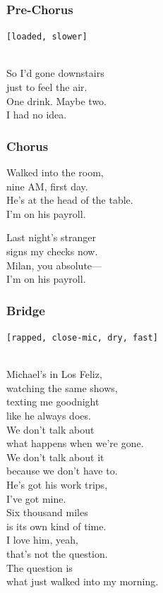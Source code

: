 \subsubsection{Pre-Chorus}\label{pre-chorus-39}

\texttt{{[}loaded,\ slower{]}}\strut \\
So I'd gone downstairs\\
just to feel the air.\\
One drink. Maybe two.\\
I had no idea.

\subsubsection{Chorus}\label{chorus-53}

Walked into the room,\\
nine AM, first day.\\
He's at the head of the table.\\
I'm on his payroll.

Last night's stranger\\
signs my checks now.\\
Milan, you absolute---\\
I'm on his payroll.

\subsubsection{Bridge}\label{bridge-16}

\texttt{{[}rapped,\ close-mic,\ dry,\ fast{]}}\strut \\
Michael's in Los Feliz,\\
watching the same shows,\\
texting me goodnight\\
like he always does.\\
We don't talk about\\
what happens when we're gone.\\
We don't talk about it\\
because we don't have to.\\
He's got his work trips,\\
I've got mine.\\
Six thousand miles\\
is its own kind of time.\\
I love him, yeah,\\
that's not the question.\\
The question is\\
what just walked into my morning.

